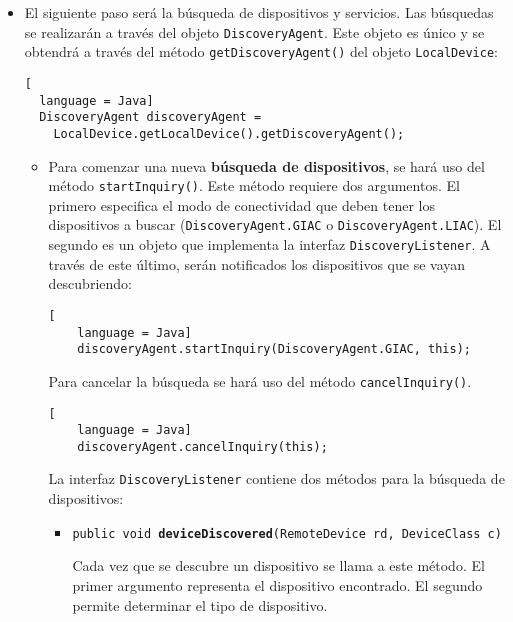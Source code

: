 \begin{itemize}
\begin{itemize}
  \begin{lstlisting}[
    language = Java]
    localDevice.setDiscoverable(DiscoveryAgent.GIAC);
  \end{lstlisting}
  \end{itemize}

\item El siguiente paso será la búsqueda de dispositivos y servicios. Las
búsquedas se realizarán a través del objeto \texttt{DiscoveryAgent}. Este
objeto es único y se obtendrá a través del método \texttt{getDiscoveryAgent()}
del objeto \texttt{LocalDevice}:

\begin{lstlisting}[
  language = Java]
  DiscoveryAgent discoveryAgent =
    LocalDevice.getLocalDevice().getDiscoveryAgent();
\end{lstlisting}
  \begin{itemize}
  \item Para comenzar una nueva \textbf{búsqueda de dispositivos}, se hará uso 
  del método \texttt{startInquiry()}. Este método requiere dos argumentos. El 
  primero especifica el modo de conectividad que deben tener los dispositivos a 
  buscar (\texttt{DiscoveryAgent.GIAC} o \texttt{DiscoveryAgent.LIAC}).
  El segundo es un objeto que implementa la interfaz
  \texttt{DiscoveryListener}. A través de este último, serán notificados los 
  dispositivos que se vayan descubriendo:

  \begin{lstlisting}[
    language = Java]
    discoveryAgent.startInquiry(DiscoveryAgent.GIAC, this);
  \end{lstlisting}

  Para cancelar la búsqueda se hará uso del método \texttt{cancelInquiry()}.

  \begin{lstlisting}[
    language = Java]
    discoveryAgent.cancelInquiry(this);
  \end{lstlisting}

  La interfaz \texttt{DiscoveryListener} contiene dos métodos para la 
  búsqueda de dispositivos:
    \begin{itemize}
    \item \texttt{public void \textbf{deviceDiscovered}(RemoteDevice rd,
      DeviceClass c)}

    Cada vez que se descubre un dispositivo se llama a este método. El primer
    argumento representa el dispositivo encontrado. El segundo permite 
    determinar el tipo de dispositivo.


\end{itemize}
\end{itemize}
\end{itemize}
